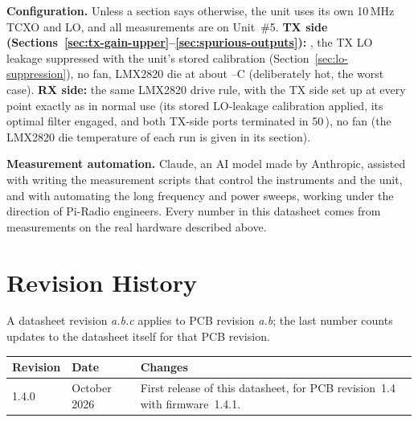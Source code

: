 \textbf{Configuration.} Unless a section says otherwise, the unit uses its own 10\,MHz TCXO and LO, and all measurements are on Unit~\#5. \textbf{TX side (Sections~\ref{sec:tx-gain-upper}--\ref{sec:spurious-outputs}):} \lmxDriveRule, the TX LO leakage suppressed with the unit's stored calibration (Section~\ref{sec:lo-suppression}), no fan, LMX2820 die at about \condGainMinC--\condCompMaxC\textdegree C (deliberately hot, the worst case). \textbf{RX side:} the same LMX2820 drive rule, with the TX side set up at every point exactly as in normal use (its stored LO-leakage calibration applied, its optimal filter engaged, and both TX-side ports terminated in 50\,\textohm), no fan (the LMX2820 die temperature of each run is given in its section).

\textbf{Measurement automation.} Claude, an AI model made by Anthropic, assisted with writing the measurement scripts
that control the instruments and the unit, and with automating the long frequency and power sweeps, working under
the direction of Pi-Radio engineers. Every number in this datasheet comes from measurements on the real hardware
described above.

\section{Revision History}
\label{sec:revisions}

A datasheet revision \textit{a.b.c} applies to PCB revision \textit{a.b}; the last number counts updates to the
datasheet itself for that PCB revision.

\par\medskip\noindent\begin{minipage}{\linewidth}%
\begin{center}
\label{tab:revisions}
\vspace{0.4em}
\footnotesize
\begin{tabularx}{0.84\linewidth}{|l|l|X|}
\hline
\textbf{Revision} & \textbf{Date} & \textbf{Changes} \\
\hline
1.4.0 & October 2026 & First release of this datasheet, for PCB revision~1.4 with firmware~1.4.1. \\
\hline
\end{tabularx}
\end{center}
\end{minipage}\par
